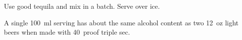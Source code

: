 

Use good tequila and mix in a batch. Serve over ice.

\begin{ingredients}
\end{ingredients}

A single \SI{100}{ml} serving has about the same alcohol content as two \SI{12}{oz} light beers when made with \SI{40}{proof} triple sec.
